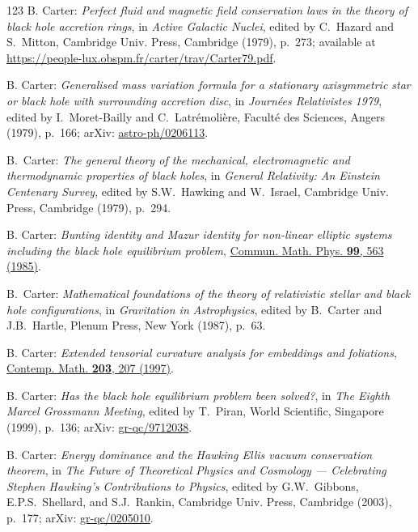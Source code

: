 \begin{thebibliography}{123}
B. Carter:
{\em Perfect fluid and magnetic field conservation laws in the theory of black hole accretion rings},
in {\em Active Galactic Nuclei}, edited by C.~Hazard and S.~Mitton,
Cambridge Univ. Press, Cambridge (1979), p.~273; available at
\url{https://people-lux.obspm.fr/carter/trav/Carter79.pdf}.

B. Carter:
{\em Generalised mass variation formula for a stationary axisymmetric star or black hole with surrounding accretion disc},
in {\em Journées Relativistes 1979}, edited by  I.~Moret-Bailly and C.~Latrémolière,
Faculté des Sciences, Angers (1979), p.~166;
arXiv: \href{https://arxiv.org/abs/astro-ph/0206113}{astro-ph/0206113}.

B.~Carter:
{\em The general theory of the mechanical, electromagnetic and thermodynamic properties of black holes}, in {\em General Relativity: An Einstein Centenary Survey},
edited by S.W.~Hawking and W.~Israel,
Cambridge Univ. Press, Cambridge (1979), p.~294.

B. Carter:
{\em Bunting identity and Mazur identity for non-linear elliptic systems including the black hole equilibrium problem},
\href{https://doi.org/10.1007/BF01215910}{Commun. Math. Phys. {\bf 99}, 563 (1985)}.

B.~Carter:
{\em Mathematical foundations of the theory of
relativistic stellar and black hole configurations},
in {\em Gravitation in Astrophysics}, edited by B.~Carter and J.B.~Hartle,
Plenum Press, New York (1987), p.~63.

B. Carter:
{\em Extended tensorial curvature analysis for embeddings and foliations},
\href{http://dx.doi.org/10.1090/conm/203}{Contemp. Math. {\bf 203}, 207 (1997)}.

B. Carter: {\em Has the black hole equilibrium problem been solved?},
in {\em The Eighth Marcel Grossmann Meeting}, edited by T.~Piran,
World Scientific, Singapore (1999), p.~136;
arXiv: \href{https://arxiv.org/abs/gr-qc/9712038}{gr-qc/9712038}.

B. Carter: {\em Energy dominance and the Hawking Ellis vacuum conservation theorem},
in {\em The Future of Theoretical Physics and Cosmology ---
Celebrating Stephen Hawking's Contributions to Physics}, edited by G.W.~Gibbons, E.P.S.~Shellard,
and S.J.~Rankin,
Cambridge Univ. Press, Cambridge (2003), p.~177;
arXiv: \href{https://arxiv.org/abs/gr-qc/0205010}{gr-qc/0205010}.


\end{thebibliography}
